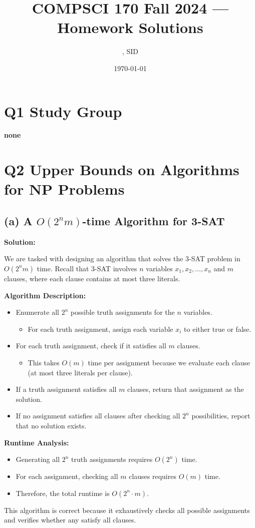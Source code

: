 \documentclass[11pt]{article}
\title{COMPSCI 170 Fall 2024 --- Homework \Homework Solutions}
\author{\Name, SID \SID}
\date{\today}
\newenvironment{solution}{%
    \par\noindent\textbf{Solution:}\par%
}{\par}
\begin{document}
\maketitle

\section*{Q1 Study Group}

\textbf{none}

\newpage


\section*{Q2 Upper Bounds on Algorithms for NP Problems}

\subsection*{(a) A $O(2^n m)$-time Algorithm for 3-SAT}

\begin{solution}
We are tasked with designing an algorithm that solves the 3-SAT problem in $O(2^n m)$ time. Recall that 3-SAT involves $n$ variables $x_1, x_2, \dots, x_n$ and $m$ clauses, where each clause contains at most three literals.

\textbf{Algorithm Description:}
\begin{itemize}
    \item Enumerate all $2^n$ possible truth assignments for the $n$ variables.
    \begin{itemize}
        \item For each truth assignment, assign each variable $x_i$ to either true or false.
    \end{itemize}
    \item For each truth assignment, check if it satisfies all $m$ clauses.
    \begin{itemize}
        \item This takes $O(m)$ time per assignment because we evaluate each clause (at most three literals per clause).
    \end{itemize}
    \item If a truth assignment satisfies all $m$ clauses, return that assignment as the solution.
    \item If no assignment satisfies all clauses after checking all $2^n$ possibilities, report that no solution exists.
\end{itemize}

\textbf{Runtime Analysis:}
\begin{itemize}
    \item Generating all $2^n$ truth assignments requires $O(2^n)$ time.
    \item For each assignment, checking all $m$ clauses requires $O(m)$ time.
    \item Therefore, the total runtime is $O(2^n \cdot m)$.
\end{itemize}

This algorithm is correct because it exhaustively checks all possible assignments and verifies whether any satisfy all clauses.
\end{solution}
\end{document}

